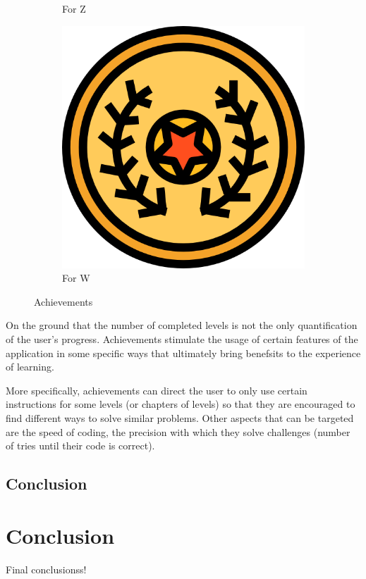 \documentclass[12 pct]{report}
\begin{document}
\begin{figure}[H]
\begin{subfigure}[b]{0.3\linewidth}
    \caption{For Z}
  \end{subfigure}
  \begin{subfigure}[b]{0.3\linewidth}
    \includegraphics[width=\linewidth]{ArRobotCodeAchiv4}
    \caption{For W}
  \end{subfigure}
  \caption{Achievements}
  \label{fig:coffee3}
\end{figure}

On the ground that the number of completed levels is not the only quantification of the user's progress. Achievements stimulate the usage of certain features of the application in some specific ways that ultimately bring benefsits to the experience of learning.

More specifically, achievements can direct the user to only use certain instructions for some levels (or chapters of levels) so that they are encouraged to find different ways to solve similar problems. Other aspects that can be targeted are the speed of coding, the precision with which they solve challenges (number of tries until their code is correct).

\section{Conclusion}

\chapter{Conclusion}
Final conclusionss!
\end{document}
